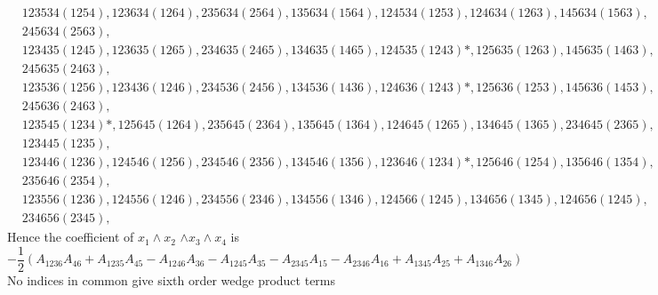 \documentclass[aps, preprint]{revtex4}
\begin{document}
\begin{align*} & 123534 \left (1254\right ) ,123634 \left (1264\right ) ,235634 \left (2564\right ) ,135634 \left (1564\right ) ,124534 \left (1253\right ) ,124634 \left (1263\right ) ,145634 \left (1563\right )\text{,} \\
 & 245634 \left (2563\right )\text{,} \\
 & 123435 \left (1245\right ) ,123635 \left (1265\right ) ,234635 \left (2465\right ) ,134635 \left (1465\right ) ,124535 \left (1243\right ) \ast  , 125635 \left (1263\right ) ,145635 \left (1463\right )\text{,} \\
 & 245635 \left (2463\right )\text{,} \\
 & 123536 \left (1256\right ) ,123436 \left (1246\right ) ,234536 \left (2456\right ) ,134536 \left (1436\right ) ,124636 \left (1243\right ) \ast  , 125636 \left (1253\right ) ,145636 \left (1453\right )\text{,} \\
 & 245636 \left (2463\right )\text{,}\end{align*}
\begin{align*} & 123545 \left (1234\right ) \ast  , 125645 \left (1264\right ) ,235645 \left (2364\right ) ,135645 \left (1364\right ) ,124645 \left (1265\right ) ,134645 \left (1365\right ) ,234645 \left (2365\right )\text{,} \\
 & 123445 \left (1235\right )\text{,} \\
 & 123446 \left (1236\right ) ,124546 \left (1256\right ) ,234546 \left (2356\right ) ,134546 \left (1356\right ) ,123646 \left (1234\right ) \ast  , 125646 \left (1254\right ) ,135646 \left (1354\right )\text{,} \\
 & 235646 \left (2354\right )\text{,}\end{align*}
\begin{align} & 123556 \left (1236\right ) ,124556 \left (1246\right ) ,234556 \left (2346\right ) ,134556 \left (1346\right ) ,124566 \left (1245\right ) ,134656 \left (1345\right ) ,124656 \left (1245\right ) , \nonumber  \\
 & 234656 \left (2345\right )\text{,}\end{align}Hence the coefficient of $x_{1} \wedge x_{2}$ $ \wedge x_{3} \wedge x_{4}$ is
\begin{equation} -\frac{1}{2} \left (A_{1 2 3 6} A_{4 6} +A_{1 2 3 5} A_{4 5} -A_{1 2 4 6} A_{3 6} -A_{1 2 4 5} A_{3 5} -A_{2 3 4 5} A_{1 5} -A_{2 3 4 6} A_{1 6} +A_{1 3 4 5} A_{2 5} +A_{1 3 4 6} A_{2 6}\right )
\end{equation}No indices in common give sixth order wedge product terms
\end{document}
